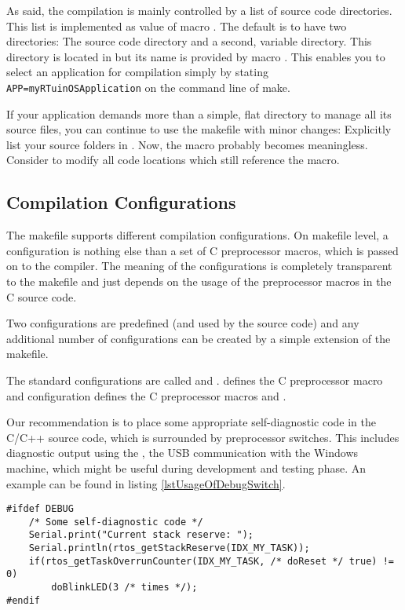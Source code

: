 As said, the compilation is mainly controlled by a list of source code
directories. This list is implemented as value of macro
. The default is to have two directories: The \rtos{}
source code directory  and a second,
variable directory. This directory is located in
 but its name is provided by macro
. This enables you to select an application for compilation
simply by stating \verb+APP=myRTuinOSApplication+ on the command line of
make.

If your application demands more than a simple, flat directory to manage
all its source files, you can continue to use the makefile with minor
changes: Explicitly list your source folders in . Now,
the macro  probably becomes meaningless. Consider to modify all
code locations which still reference the macro.


\subsection{Compilation Configurations}

The makefile supports different compilation configurations. On makefile
level, a configuration is nothing else than a set of C preprocessor
macros, which is passed on to the compiler. The meaning of the
configurations is completely transparent to the makefile and just depends
on the usage of the preprocessor macros in the C source code.

Two configurations are predefined (and used by the \rtos{} source code)
and any additional number of configurations can be created by a simple
extension of the makefile.

The standard configurations are called  and
.  defines the C preprocessor macro
 and configuration  defines the C
preprocessor macros  and .

Our recommendation is to place some appropriate self-diagnostic code in
the C/C++ source code, which is surrounded by preprocessor switches. This
includes diagnostic output using the , the USB
communication with the Windows machine, which might be useful during
development and testing phase. An example can be found in listing
\ref{lstUsageOfDebugSwitch}.
  
\begin{lstlisting}[float, caption={Usage of preprocessor switches
supporting different compile configurations},
label=lstUsageOfDebugSwitch, captionpos=b]
#ifdef DEBUG
    /* Some self-diagnostic code */
    Serial.print("Current stack reserve: ");
    Serial.println(rtos_getStackReserve(IDX_MY_TASK));
    if(rtos_getTaskOverrunCounter(IDX_MY_TASK, /* doReset */ true) != 0)
        doBlinkLED(3 /* times */);
#endif
\end{lstlisting}

